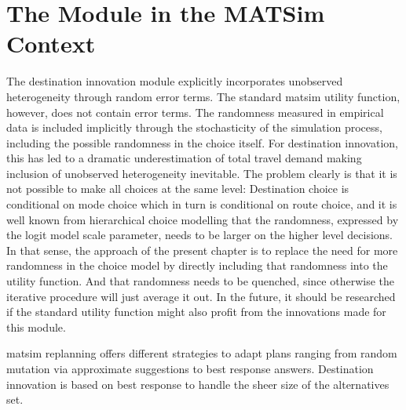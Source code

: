 \section{The Module in the MATSim Context}
The destination innovation module explicitly incorporates unobserved heterogeneity through random error terms. 
The standard \gls{matsim} utility function, however, does not contain error terms. 
The randomness measured in empirical data is included implicitly through the stochasticity of the simulation process, {\orange including the possible randomness in the choice itself}. 
For destination innovation, this has led to a dramatic underestimation of total travel demand making inclusion of unobserved heterogeneity inevitable.
%
{\orange The problem clearly is that it is not possible to make all choices at the same level: Destination choice is conditional on mode choice which in turn is conditional on route choice, and it is well known from hierarchical choice modelling that the randomness, expressed by the logit model scale parameter, needs to be larger on the higher level decisions.  In that sense, the approach of the present chapter is to replace the need for more randomness in the choice model by directly including that randomness into the utility function. And that randomness needs to be quenched, since otherwise the iterative procedure will just average it out. }
%
In the future, it should be researched if the standard utility function might also profit from the innovations made for this module.

\gls{matsim} replanning offers different strategies to adapt plans ranging from random mutation via approximate suggestions to best response answers. 
Destination innovation is based on best response to handle the sheer size of the alternatives set. 

